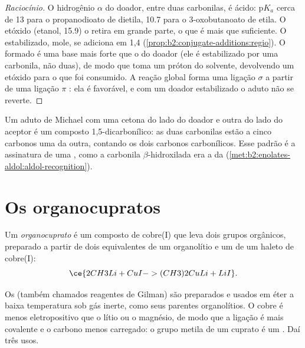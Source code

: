 \begin{proof}[Raciocínio]
O hidrogênio $\alpha$ do doador, entre duas carbonilas, é ácido: $\mathrm pK_a$ cerca de 13 para o
propanodioato de dietila, 10.7 para o 3-oxobutanoato de etila. O etóxido (etanol, 15.9) o retira em
grande parte, o que é mais que suficiente. O  estabilizado, mole, se adiciona em 1,4
(\cref{prop:b2:conjugate-additions:regio}). O  formado é uma base mais forte que o  do
doador (ele é estabilizado por uma carbonila, não duas), de modo que toma um próton do solvente,
devolvendo um etóxido para o que foi consumido. A reação global forma uma ligação $\sigma$  a
partir de uma ligação $\pi$ : ela é favorável, e com um doador estabilizado o aduto não se reverte.
\end{proof}

Um aduto de Michael com uma cetona do lado do doador e outra do lado do aceptor é um composto
1,5-dicarbonílico: as duas carbonilas estão a cinco carbonos uma da outra, contando os dois carbonos
carbonílicos. Esse padrão é a assinatura de uma , como a carbonila $\beta$-hidroxilada
era a da  (\cref{met:b2:enolates-aldol:aldol-recognition}).

\section{Os organocupratos}

\begin{definition}[Organocupratos]\label{def:b2:conjugate-additions:cuprate}
Um \emph{organocuprato}  é um composto de cobre(I) que leva dois grupos
orgânicos, preparado a partir de dois equivalentes de um organolítio e um de um haleto de cobre(I):
\begin{equation*}
\ce{2 CH3Li + CuI -> (CH3)2CuLi + LiI}.
\end{equation*}
\end{definition}

Os  (também chamados reagentes de Gilman) são preparados e usados em éter a baixa
temperatura sob gás inerte, como seus parentes organolítios. O cobre é menos eletropositivo que o lítio
ou o magnésio, de modo que a ligação  é mais covalente e o carbono menos carregado: o grupo
metila de um cuprato é um . Daí três usos.

